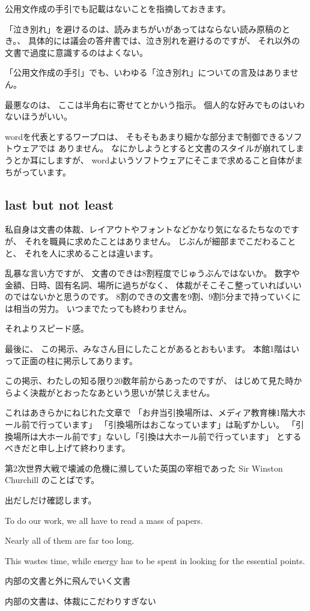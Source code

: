 \documentclass[uplatex,jis2004,dvipdfmx,12pt]{jsarticle}
\begin{document}
公用文作成の手引でも記載はないことを指摘しておきます。

「泣き別れ」を避けるのは、読みまちがいがあってはならない読み原稿のとき。、
具体的には議会の答弁書では、泣き別れを避けるのですが、
それ以外の文書で過度に意識するのはよくない。

「公用文作成の手引」でも、いわゆる「泣き別れ」についての言及はありません。

\if
最悪なのは、
ここは半角右に寄せてとかいう指示。
個人的な好みでものはいわないほうがいい。


wordを代表とするワープロは、
そもそもあまり細かな部分まで制御できるソフトウェアでは
ありません。
なにかしようとすると文書のスタイルが崩れてしまうとか耳にしますが、
wordよいうソフトウェアにそこまで求めること自体がまちがっています。
\fi




\subsection{last but not least}
私自身は文書の体裁、レイアウトやフォントなどかなり気になるたちなのですが、
それを職員に求めたことはありません。
じぶんが細部までこだわることと、
それを人に求めることは違います。

乱暴な言い方ですが、
文書のできは8割程度でじゅうぶんではないか。
数字や金額、日時、固有名詞、場所に過ちがなく、
体裁がそこそこ整っていればいいのではないかと思うのです。
8割のできの文書を9割、9割5分まで持っていくには相当の労力。
いつまでたっても終わりません。



それよりスピード感。


最後に、
この掲示、みなさん目にしたことがあるとおもいます。
本館1階はいって正面の柱に掲示してあります。

この掲示、わたしの知る限り20数年前からあったのですが、
はじめて見た時からよく決裁がとおったなあという思いが禁じえません。

これはあきらかにねじれた文章で
「お弁当引換場所は、メディア教育棟1階大ホール前で行っています」
「引換場所はおこなっています」は恥ずかしい。
「引換場所は大ホール前です」ないし「引換は大ホール前で行っています」
とするべきだと申し上げて終わります。



第2次世界大戦で壊滅の危機に瀕していた英国の宰相であった Sir Winston Churchill
のことばです。


出だしだけ確認します。

To do our work, we all have to read a mass of papers.

 Nearly all of them are far too long.

 This wastes time, while energy has to be spent in looking for the essential points.



内部の文書と外に飛んでいく文書

内部の文書は、体裁にこだわりすぎない
\end{document}
